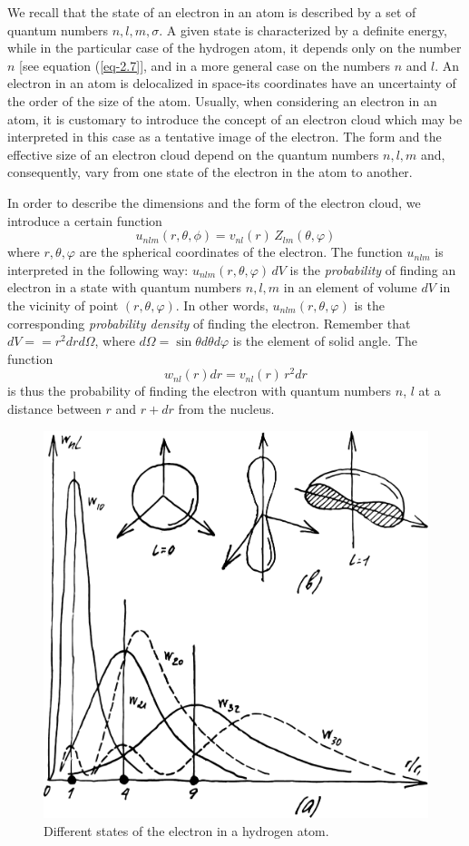 \documentclass[a4paper,sfsidenotes,colorlinks=true]{tufte-book}
\numberwithin{equation}{section}
\numberwithin{figure}{section}
\begin{document}
We recall that the state of an electron in an atom is described by a
set of quantum numbers $n, l, m,\sigma$. A given state is
characterized by a definite energy, while in the particular case of
the hydrogen atom, it depends only on the number $n$ [see equation
(\ref{eq-2.7}], and in a more general case on the numbers $n$ and
  $l$. An electron in an atom is delocalized in space-its coordinates
  have an uncertainty of the order of the size of the atom. Usually,
  when considering an electron in an atom, it is customary to
  introduce the concept of an electron cloud which may be interpreted
  in this case as a tentative image of the electron. The form and the
  effective size of an electron cloud depend on the quantum numbers $n,
  l, m$ and, consequently, vary from one state of the electron in the
  atom to another.

 In order to describe the dimensions and the form of the electron
 cloud, we introduce a certain function
\begin{equation}%
 u_{nlm}(r, \theta, \phi) = v_{nl}(r) \, Z_{lm}( \theta, \varphi)
\end{equation}
where $r, \theta, \varphi$ are the spherical coordinates of the
electron. The function $u_{nlm}$ is interpreted in the following way:
$u_{nlm} (r, \theta, \varphi) \, dV$ is the \emph{probability} of finding
an electron in a state with quantum numbers $n, l, m$ in an element of
volume $dV$ in the vicinity of point $(r, \theta, \varphi)$. In other
words, $u_{nlm} (r, \theta, \varphi) $ is the corresponding
\emph{probability density} of finding the electron. Remember that $dV
= =r^{2} dr d\Omega$, where $d\Omega = \sin \theta d \theta d \varphi
$ is the element of solid angle. The function
\begin{equation}%
w_{nl} (r) dr =  v_{nl} (r) \, r^{2} dr 
\tag{5.3a}
\label{eq-5.3a} 
\end{equation}
is thus the probability of finding the electron with quantum numbers
$n$, $l$ at a distance between $r$ and $r +dr$ from the nucleus.

\begin{figure}%
\centering
\includegraphics[width=0.7\linewidth]{figures/fig-05-02.pdf}
\caption{Different states of the electron in a hydrogen atom.}
\label{fig-5.2}
\end{figure}
\end{document}
